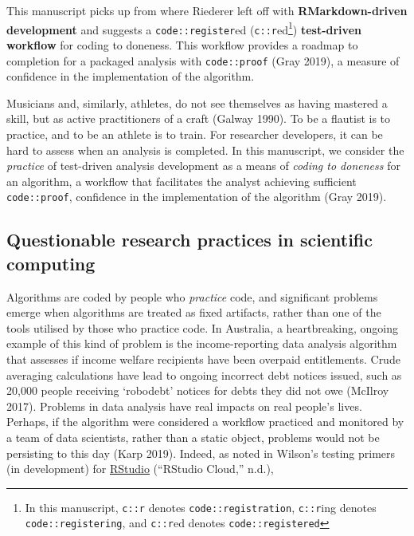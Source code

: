 \documentclass[
]{article}
\begin{document}
This manuscript picks up from where Riederer left off with
\textbf{RMarkdown-driven development} and suggests a
\texttt{code::register}ed (\texttt{c::r}ed\footnote{In this manuscript,
  \texttt{c::r} denotes \texttt{code::registration}, \texttt{c::r}ing
  denotes \texttt{code::registering}, and \texttt{c::r}ed denotes
  \texttt{code::registered}}) \textbf{test-driven workflow} for coding
to doneness. This workflow provides a roadmap to completion for a
packaged analysis with \texttt{code::proof} (Gray 2019), a measure of
confidence in the implementation of the algorithm.

Musicians and, similarly, athletes, do not see themselves as having
mastered a skill, but as active practitioners of a craft (Galway 1990).
To be a flautist is to practice, and to be an athlete is to train. For
researcher developers, it can be hard to assess when an analysis is
completed. In this manuscript, we consider the \emph{practice} of
test-driven analysis development as a means of \emph{coding to doneness}
for an algorithm, a workflow that facilitates the analyst achieving
sufficient \texttt{code::proof}, confidence in the implementation of the
algorithm (Gray 2019).

\hypertarget{questionable-research-practices-in-scientific-computing}{%
\subsection{Questionable research practices in scientific
computing}\label{questionable-research-practices-in-scientific-computing}}

Algorithms are coded by people who \emph{practice} code, and significant
problems emerge when algorithms are treated as fixed artifacts, rather
than one of the tools utilised by those who practice code. In Australia,
a heartbreaking, ongoing example of this kind of problem is the
income-reporting data analysis algorithm that assesses if income welfare
recipients have been overpaid entitlements. Crude averaging calculations
have lead to ongoing incorrect debt notices issued, such as 20,000
people receiving `robodebt' notices for debts they did not owe (McIlroy
2017). Problems in data analysis have real impacts on real people's
lives. Perhaps, if the algorithm were considered a workflow practiced
and monitored by a team of data scientists, rather than a static object,
problems would not be persisting to this day (Karp 2019). Indeed, as
noted in Wilson's testing primers (in development) for
\href{https://rstudio.cloud/learn/primers}{RStudio} (``RStudio Cloud,''
n.d.),
\end{document}
